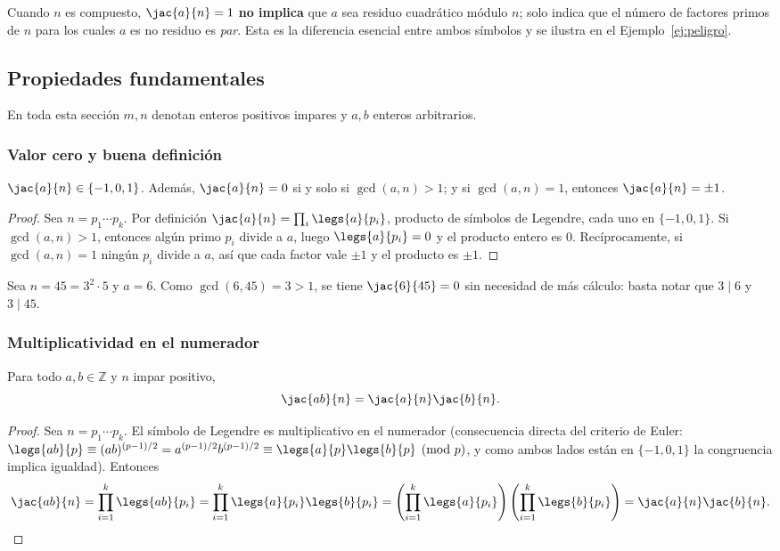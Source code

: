 \begin{observacion}\label{obs:peligro}
Cuando $n$ es compuesto, $\jac{a}{n}=1$ \textbf{no implica} que $a$ sea residuo cuadrático módulo $n$; solo indica que el número de factores primos de $n$ para los cuales $a$ es no residuo es \emph{par}. Esta es la diferencia esencial entre ambos símbolos y se ilustra en el Ejemplo~\ref{ej:peligro}.
\end{observacion}

\subsection{Propiedades fundamentales}

En toda esta sección $m,n$ denotan enteros positivos impares y $a,b$ enteros arbitrarios.

\subsubsection{Valor cero y buena definición}

\begin{teorema}\label{t1}
$\jac{a}{n}\in\{-1,0,1\}$. Además, $\jac{a}{n}=0$ si y solo si $\gcd(a,n)>1$; y si $\gcd(a,n)=1$, entonces $\jac{a}{n}=\pm1$.
\end{teorema}
\begin{proof}
Sea $n=p_1\cdots p_k$. Por definición $\jac{a}{n}=\prod_i \legs{a}{p_i}$, producto de símbolos de Legendre, cada uno en $\{-1,0,1\}$. Si $\gcd(a,n)>1$, entonces algún primo $p_i$ divide a $a$, luego $\legs{a}{p_i}=0$ y el producto entero es $0$. Recíprocamente, si $\gcd(a,n)=1$ ningún $p_i$ divide a $a$, así que cada factor vale $\pm1$ y el producto es $\pm1$.
\end{proof}

\begin{ejemplo}
Sea $n=45=3^2\cdot5$ y $a=6$. Como $\gcd(6,45)=3>1$, se tiene $\jac{6}{45}=0$ sin necesidad de más cálculo: basta notar que $3\mid 6$ y $3\mid 45$.
\end{ejemplo}

\subsubsection{Multiplicatividad en el numerador}

\begin{teorema}\label{t2}
Para todo $a,b\in\mathbb{Z}$ y $n$ impar positivo,
\[
\jac{ab}{n}=\jac{a}{n}\jac{b}{n}.
\]
\end{teorema}
\begin{proof}
Sea $n=p_1\cdots p_k$. El símbolo de Legendre es multiplicativo en el numerador (consecuencia directa del criterio de Euler: $\legs{ab}{p}\equiv(ab)^{(p-1)/2}=a^{(p-1)/2}b^{(p-1)/2}\equiv\legs{a}{p}\legs{b}{p}\pmod p$, y como ambos lados están en $\{-1,0,1\}$ la congruencia implica igualdad). Entonces
\[
\jac{ab}{n}=\prod_{i=1}^k\legs{ab}{p_i}=\prod_{i=1}^k\legs{a}{p_i}\legs{b}{p_i}=\left(\prod_{i=1}^k\legs{a}{p_i}\right)\left(\prod_{i=1}^k\legs{b}{p_i}\right)=\jac{a}{n}\jac{b}{n}. \qedhere
\]
\end{proof}

